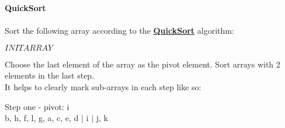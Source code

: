 \textbf{\LARGE{\color{tumgadPurple}QuickSort}}\\
\\
\noindent
Sort the following array according to the \href{https://sebastianoner.github.io/TUMGAD/src/Algorithms/Sorting/QuickSort/QuickSort}{\textbf{\underline{QuickSort}}} algorithm:
\begin{center}
    $INITARRAY$
\end{center}
Choose the last element of the array as the pivot element. Sort arrays with 2 elements in the last step.\\
It helps to clearly mark sub-arrays in each step like so:
\noindent
\begin{center}
    Step one - pivot: i\\
    b, h, f, l, g, a, c, e, d $|$ i $|$ j, k\\
    \vspace{10px}
\end{center}
